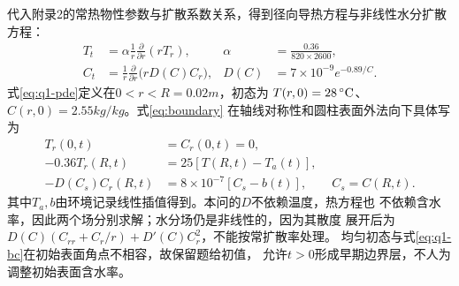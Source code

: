 代入附录2的常热物性参数与扩散系数关系，得到径向导热方程与非线性水分扩散方程：
\begin{equation}
\begin{aligned}
T_t&=\alpha\frac{1}{r}\frac{\partial}{\partial r}(rT_r),
&\alpha&=\frac{0.36}{820\times2600},\\
C_t&=\frac{1}{r}\frac{\partial}{\partial r}\bigl(rD(C)C_r\bigr),
&D(C)&=7\times10^{-9}e^{-0.89/C}.
\end{aligned}
\label{eq:q1-pde}
\end{equation}
式\eqref{eq:q1-pde}定义在$0<r<R=0.02\unit{m}$，初态为
$T(r,0)=28\celsius$、$C(r,0)=2.55\unit{kg/kg}$。式\eqref{eq:boundary}
在轴线对称性和圆柱表面外法向下具体写为
\begin{equation}
\begin{aligned}
T_r(0,t)&=C_r(0,t)=0,\\
-0.36T_r(R,t)&=25[T(R,t)-T_a(t)],\\
-D(C_s)C_r(R,t)&=8\times10^{-7}[C_s-b(t)],\qquad C_s=C(R,t).
\end{aligned}
\label{eq:q1-bc}
\end{equation}
其中$T_a,b$由环境记录线性插值得到。本问的$D$不依赖温度，热方程也
不依赖含水率，因此两个场分别求解；水分场仍是非线性的，因为其散度
展开后为$D(C)(C_{rr}+C_r/r)+D'(C)C_r^2$，不能按常扩散率处理。
均匀初态与式\eqref{eq:q1-bc}在初始表面角点不相容，故保留题给初值，
允许$t>0$形成早期边界层，不人为调整初始表面含水率。

